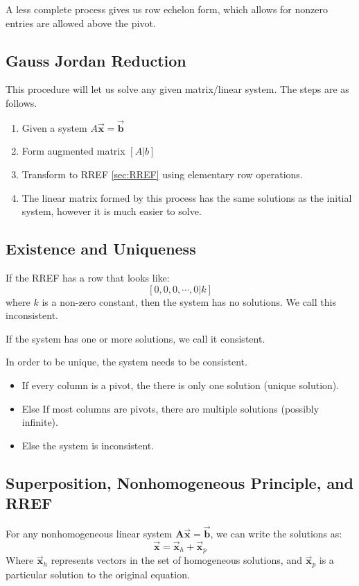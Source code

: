 \documentclass[12pt, landscape, twocolumn]{article}
\let\oldvec\vec
\renewcommand{\vec}[1]{\oldvec{\mathbf{ #1 } } }                    %
\begin{document}
    A less complete process gives us row echelon form, which allows for nonzero entries are allowed above the pivot.

    \subsection{Gauss Jordan Reduction}
    This procedure will let us solve any given matrix/linear system. The steps are as follows.

    \begin{enumerate}
        \item Given a system $A\vec{x} = \vec{b}$
        \item Form augmented matrix $[A|b]$
        \item Transform to RREF \eqref{sec:RREF} using elementary row operations.
        \item The linear matrix formed by this process has the same solutions as the initial system, however it is much easier to solve.
    \end{enumerate}

    \subsection{Existence and Uniqueness}
    If the RREF has a row that looks like:
    \[
        [0, 0, 0, \cdots, 0 | k]
    \]
    where $k$ is a non-zero constant, then the system has no solutions. We call this inconsistent.

    If the system has one or more solutions, we call it consistent.

    In order to be unique, the system needs to be consistent.
        \begin{itemize}
            \item If every column is a pivot, the there is only one solution (unique solution).
            \item Else If most columns are pivots, there are multiple solutions (possibly infinite).
            \item Else the system is inconsistent.
        \end{itemize}

    \subsection{Superposition, Nonhomogeneous Principle, and RREF}
    For any nonhomogeneous linear system $\mathbf{A}\vec{x} = \vec{b}$, we can write the solutions as:
    \[
        \vec{x} = \vec{x}_h + \vec{x}_p
    \]
    Where $\vec{x}_h$ represents vectors in the set of homogeneous solutions, and $\vec{x}_p$ is a particular solution to the original equation.
\end{document}

